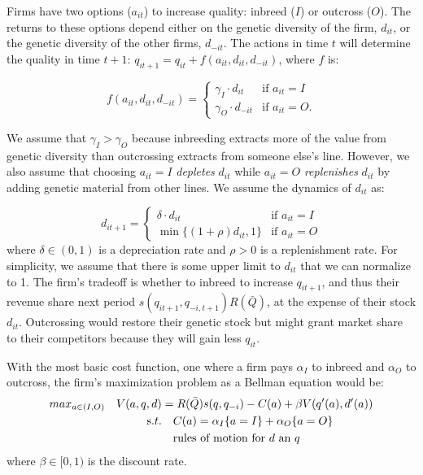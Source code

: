 \documentclass[12pt,letterpaper]{article}
\begin{document}
Firms have two options ($a_{it}$) to increase quality: inbreed ($I$) or outcross ($O$).
The returns to these options depend either on the genetic diversity of the firm, $d_{it}$, or the genetic diversity of the other firms, $d_{-it}$.
The actions in time $t$ will determine the quality in time $t+1$: $q_{it+1} = q_{it} + f(a_{it},d_{it},d_{-it})$, where $f$ is:

$$f(a_{it},d_{it},d_{-it}) = \begin{cases}
\gamma_I \cdot d_{it} & \text{if } a_{it} = I \\
\gamma_O \cdot d_{-it} & \text{if } a_{it} = O.
\end{cases}$$

We assume that $\gamma_I>\gamma_O$ because inbreeding extracts more of the value from genetic diversity than outcrossing extracts from someone else's line.
However, we also assume that choosing $a_{it}=I$ \textit{depletes} $d_{it}$ while $a_{it}=O$ \textit{replenishes} $d_{it}$ by adding genetic material from other lines.
We assume the dynamics of $d_{it}$ as:

$$d_{it+1} = \begin{cases}
\delta \cdot d_{it} & \text{if } a_{it} = I \\
\min\{(1+\rho)d_{it}, 1\} & \text{if } a_{it} = O
\end{cases}$$
where $\delta \in (0,1)$ is a depreciation rate and $\rho >0$ is a replenishment rate. For simplicity, we assume that there is some upper limit to $d_{it}$ that we can normalize to 1.
The firm's tradeoff is whether to inbreed to increase $q_{it+1}$, and thus their revenue share next period $s(q_{it+1},q_{-i,t+1}) R(\bar{Q})$, at the expense of their stock $d_{it}$.
Outcrossing would restore their genetic stock but might grant market share to their competitors because they will gain less $q_{it}$.

With the most basic cost function, one where a firm pays $\alpha_I$ to inbreed and $\alpha_O$ to outcross, the firm's maximization problem as a Bellman equation would be:
\begin{align*}
max_{a \in (I,O)} \quad  V(a,q,d) &= R(\bar{Q}) s(q,q_{-i}) -C(a) + \beta V(q'(a),d'(a)) \\
\text s.t.&\quad  C(a) = \alpha_I \{a=I\} + \alpha_O \{a=O\}\\
          &\quad \text{rules of motion for $d$ an $q$}\\
          \end{align*}
where $\beta \in [0,1)$ is the discount rate.
\end{document}

